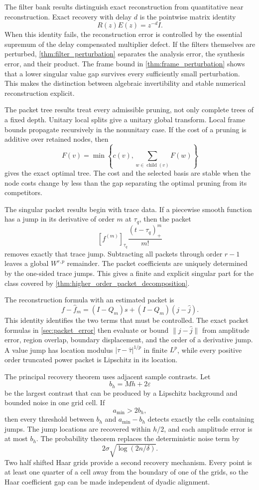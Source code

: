 \documentclass[11pt,letterpaper]{article}
\theoremstyle{plain}
\theoremstyle{plain}
\theoremstyle{plain}
\theoremstyle{definition}
\theoremstyle{definition}
\theoremstyle{definition}
\theoremstyle{definition}
\theoremstyle{remark}
\theoremstyle{remark}
\theoremstyle{remark}
\theoremstyle{remark}
\newcommand{\jump}[1]{\left[#1\right]}
\let\KomorebiPrimitiveWidehat\widehat
\renewcommand{\widehat}[1]{\KomorebiPrimitiveWidehat{#1}}
\begin{document}
The filter bank results distinguish exact reconstruction from quantitative near reconstruction. Exact recovery with delay \(d\) is the pointwise matrix identity
\[
R(z)E(z)=z^{-d}I.
\]
When this identity fails, the reconstruction error is controlled by the essential supremum of the delay compensated multiplier defect. If the filters themselves are perturbed, \cref{thm:filter_perturbation} separates the analysis error, the synthesis error, and their product. The frame bound in \cref{thm:frame_perturbation} shows that a lower singular value gap survives every sufficiently small perturbation. This makes the distinction between algebraic invertibility and stable numerical reconstruction explicit.

The packet tree results treat every admissible pruning, not only complete trees of a fixed depth. Unitary local splits give a unitary global transform. Local frame bounds propagate recursively in the nonunitary case. If the cost of a pruning is additive over retained nodes, then
\[
F(v)
=
\min\left\{
c(v),
\sum_{w\in\operatorname{child}(v)}F(w)
\right\}
\]
gives the exact optimal tree. The cost and the selected basis are stable when the node costs change by less than the gap separating the optimal pruning from its competitors.

The singular packet results begin with trace data. If a piecewise smooth function has a jump in its derivative of order \(m\) at \(\tau_q\), then the packet
\[
\jump{f^{(m)}}_{\tau_q}
\frac{(t-\tau_q)_+^m}{m!}
\]
removes exactly that trace jump. Subtracting all packets through order \(r-1\) leaves a global \(W^{r,p}\) remainder. The packet coefficients are uniquely determined by the one-sided trace jumps. This gives a finite and explicit singular part for the class covered by \cref{thm:higher_order_packet_decomposition}.

The reconstruction formula with an estimated packet is
\[
f-\widehat f_m
=
(I-Q_m)s+(I-Q_m)(j-\widehat j).
\]
This identity identifies the two terms that must be controlled. The exact packet formulas in \cref{sec:packet_error} then evaluate or bound \(\|j-\widehat j\|\) from amplitude error, region overlap, boundary displacement, and the order of a derivative jump. A value jump has location modulus \(|\tau-\widehat\tau|^{1/p}\) in finite \(L^p\), while every positive order truncated power packet is Lipschitz in its location.

The principal recovery theorem uses adjacent sample contrasts. Let
\[
b_h=Mh+2\varepsilon
\]
be the largest contrast that can be produced by a Lipschitz background and bounded noise in one grid cell. If
\[
a_{\min}>2b_h,
\]
then every threshold between \(b_h\) and \(a_{\min}-b_h\) detects exactly the cells containing jumps. The jump locations are recovered within \(h/2\), and each amplitude error is at most \(b_h\). The probability theorem replaces the deterministic noise term by
\[
2\sigma\sqrt{\log(2n/\delta)}.
\]
Two half shifted Haar grids provide a second recovery mechanism. Every point is at least one quarter of a cell away from the boundary of one of the grids, so the Haar coefficient gap can be made independent of dyadic alignment.
\end{document}
